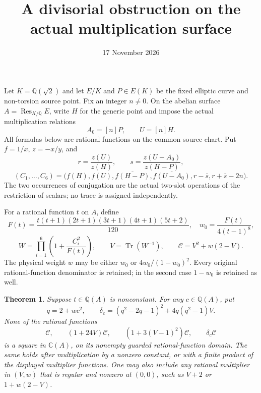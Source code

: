 \documentclass[11pt,a4paper]{article}
\title{A divisorial obstruction on the actual multiplication surface}
\author{}\date{17 November 2026}
\newtheorem{theorem}{Theorem}
\newcommand{\Q}{\mathbb Q}\newcommand{\C}{\mathbb C}
\DeclareMathOperator{\Res}{Res}\DeclareMathOperator{\Tr}{Tr}
\begin{document}
\maketitle

Let $K=\Q(\sqrt2)$ and let $E/K$ and $P\in E(K)$ be the fixed
elliptic curve and non-torsion source point. Fix an integer $n\ne0$.
On the abelian surface $A=\Res_{K/\Q}E$, write $H$ for the generic
point and impose the actual multiplication relations
\[
                       A_0=[n]P,\qquad U=[n]H.
\]
All formulas below are rational functions on the common source chart.
Put $f=1/x$, $z=-x/y$, and
\[
 r=\frac{z(U)}{z(H)},\qquad
 s=\frac{z(U-A_0)}{z(H-P)},
\]
\[
 (C_1,\ldots,C_6)=
 \bigl(f(H),f(U),\overline{f(H-P)},\overline{f(U-A_0)},
              r-\bar s,r+\bar s-2n\bigr).
\]
The two occurrences of conjugation are the actual two-slot operations
of the restriction of scalars; no trace is assigned independently.

For a rational function $t$ on $A$, define
\[
 F(t)=\frac{t(t+1)(2t+1)(3t+1)(4t+1)(5t+2)}{120},\quad
 w_0=\frac{F(t)}{4(t-1)^8},
\]
\[
 W=\prod_{i=1}^6\left(1+\frac{C_i^2}{F(t)}\right),
 \qquad V=\Tr(W^{-1}),\qquad
 \mathcal C=V^2+w(2-V).
\]
The physical weight $w$ may be either $w_0$ or
$4w_0/(1-w_0)^2$. Every original rational-function denominator is
retained; in the second case $1-w_0$ is retained as well.

\begin{theorem}\label{thm:obstruction}
Suppose $t\in\Q(A)$ is nonconstant. For any $c\in\Q(A)$, put
\[
 q=2+wc^2,\qquad
 \delta_c=(q^2-2q-1)^2+4q(q^2-1)V.
\]
None of the rational functions
\[
 \mathcal C,\qquad (1+24V)\mathcal C,\qquad
 (1+3(V-1)^2)\mathcal C,\qquad \delta_c\mathcal C
\]
is a square in $\C(A)$, on its nonempty guarded rational-function
domain. The same holds after multiplication by a nonzero constant,
or with a finite product of the displayed multiplier functions.
One may also include any rational multiplier in $(V,w)$ that is
regular and nonzero at $(0,0)$, such as $V+2$ or $1+w(2-V)$.
\end{theorem}
\end{document}
